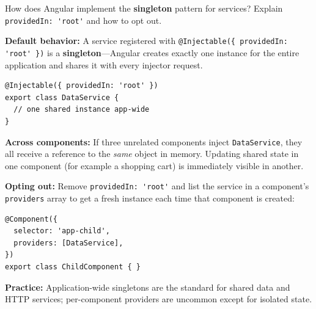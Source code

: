 \question[6]
How does Angular implement the \textbf{singleton} pattern for services? Explain \lstinline[style=tsinline]|providedIn: 'root'| and how to opt out.
\begin{solutionorbox}[4.5in]
\textbf{Default behavior:} A service registered with \lstinline[style=tsinline]|@Injectable({ providedIn: 'root' })| is a \textbf{singleton}---Angular creates exactly one instance for the entire application and shares it with every injector request.

\begin{lstlisting}[style=ts]
@Injectable({ providedIn: 'root' })
export class DataService {
  // one shared instance app-wide
}
\end{lstlisting}

\textbf{Across components:} If three unrelated components inject \lstinline[style=tsinline]|DataService|, they all receive a reference to the \emph{same} object in memory. Updating shared state in one component (for example a shopping cart) is immediately visible in another.

\textbf{Opting out:} Remove \lstinline[style=tsinline]|providedIn: 'root'| and list the service in a component's \lstinline[style=tsinline]|providers| array to get a fresh instance each time that component is created:

\begin{lstlisting}[style=ts]
@Component({
  selector: 'app-child',
  providers: [DataService],
})
export class ChildComponent { }
\end{lstlisting}

\textbf{Practice:} Application-wide singletons are the standard for shared data and HTTP services; per-component providers are uncommon except for isolated state.
\end{solutionorbox}




\newpage




